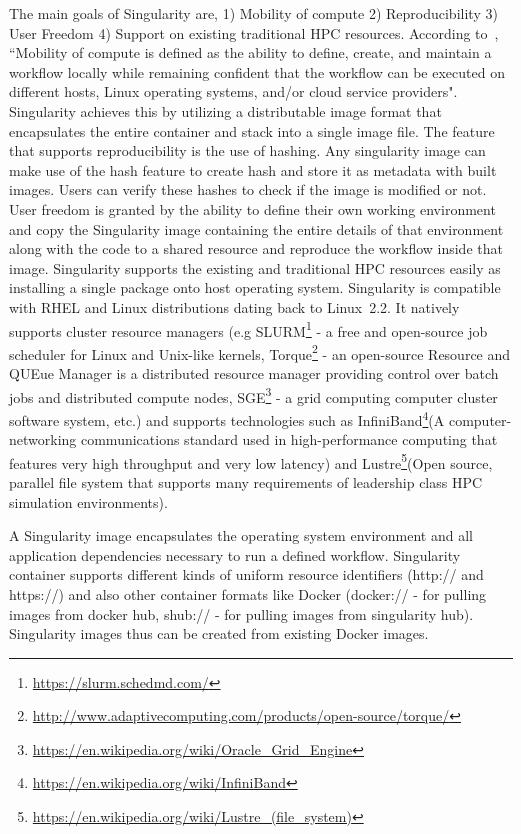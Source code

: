 The main goals of Singularity are, 1) Mobility of compute 2) 
Reproducibility 3) User Freedom 4) Support on existing traditional HPC 
resources. According to~\cite{10.1371/journal.pone.0177459}, ``Mobility 
of compute is defined as the ability to define, create, and maintain a 
workflow locally while remaining confident that the workflow can be 
executed on different hosts, Linux operating systems, and/or cloud 
service providers". Singularity achieves this by utilizing a 
distributable image format that encapsulates the entire container and 
stack into a single image file. The feature that supports 
reproducibility is the use of hashing. Any singularity image can make 
use of the hash feature to create hash and store it as metadata with 
built images. Users can verify these hashes to check if the image is 
modified or not. User freedom is granted by the ability to define their 
own working environment and copy the Singularity image containing the 
entire details of that environment along with the code to a shared 
resource and reproduce the workflow inside that image. Singularity 
supports the existing and traditional HPC resources easily as 
installing a single package onto host operating system. Singularity is 
compatible with RHEL and Linux distributions dating back to Linux~2.2. 
It natively supports cluster resource managers (e.g 
SLURM\footnote{\url{https://slurm.schedmd.com/}} - a free and 
open-source job scheduler for Linux and Unix-like kernels, 
Torque\footnote{\url{http://www.adaptivecomputing.com/products/open-source/torque/}} 
- an open-source Resource and QUEue Manager is a distributed resource 
manager providing control over batch jobs and distributed compute 
nodes, 
SGE\footnote{\url{https://en.wikipedia.org/wiki/Oracle_Grid_Engine}} - 
a grid computing computer cluster software system, etc.) and supports 
technologies such as 
InfiniBand\footnote{\url{https://en.wikipedia.org/wiki/InfiniBand}}(A 
computer-networking communications standard used in high-performance 
computing that features very high throughput and very low latency) and 
Lustre\footnote{\url{https://en.wikipedia.org/wiki/Lustre_(file_system)}}(Open 
source, parallel file system that supports many requirements of 
leadership class HPC simulation environments).

A Singularity image encapsulates the operating system environment and 
all application dependencies necessary to run a defined workflow. 
Singularity container supports different kinds of uniform resource 
identifiers (http:// and https://) and also other container formats 
like Docker (docker:// - for pulling images from docker hub, shub:// - 
for pulling images from singularity hub). Singularity images thus can 
be created from existing Docker images.

